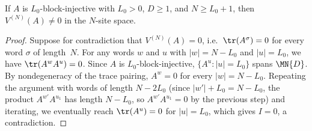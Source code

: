 \begin{theorem}%
    \label{thm:mpv_ne_zero_blk_injective}
    \leanok
    If $A$ is $L_0$-block-injective with $L_0 > 0$, $D \ge 1$, and
    $N \ge L_0 + 1$, then $V^{(N)}(A) \ne 0$ in the $N$-site space.
\end{theorem}

\begin{proof}
    \leanok
    Suppose for contradiction that $V^{(N)}(A) = 0$, i.e.\
    $\tr(A^\sigma) = 0$ for every word $\sigma$ of length~$N$.
    For any words $w$ and $u$ with $|w| = N - L_0$ and $|u| = L_0$,
    we have $\tr(A^w A^u) = 0$.
    Since $A$ is $L_0$-block-injective, $\{A^u : |u| = L_0\}$
    spans $\MN{D}$. By nondegeneracy of the trace pairing,
    $A^w = 0$ for every $|w| = N - L_0$.
    Repeating the argument with words of length $N - 2L_0$ (since
    $|w'| + L_0 = N - L_0$, the product $A^{w'} A^{u_1}$ has length
    $N - L_0$, so $A^{w'} A^{u_1} = 0$ by the previous step) and iterating,
    we eventually reach $\tr(A^u) = 0$ for $|u| = L_0$, which gives
    $I = 0$, a contradiction.
\end{proof}
